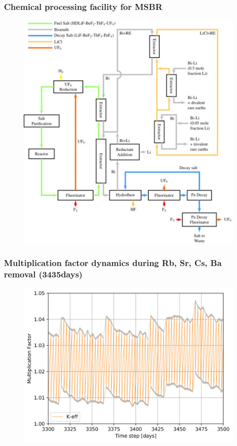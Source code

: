 \documentclass[9pt]{beamer}
\begin{document}
\begin{frame}
  \frametitle{Chemical processing facility for \gls{MSBR}}
               \begin{figure}[t]
                \vspace*{-0.1in}
                \includegraphics[height=0.65\textwidth]{./images/flowsheet.pdf}
               \end{figure}
              
\end{frame}

\begin{frame}
  \frametitle{Multiplication factor dynamics during Rb, Sr, Cs, Ba removal (3435days)}
               \begin{figure}[t]
                \vspace*{-0.1in}
                \includegraphics[height=0.7\textwidth]{./images/keff_3435st.png}
               \end{figure}
              
\end{frame}
\end{document}
